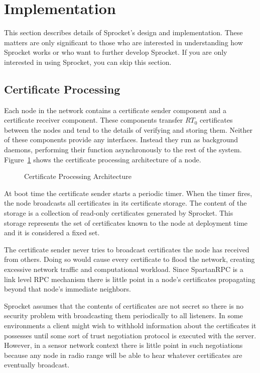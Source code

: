 \section{Implementation}

This section describes details of Sprocket's design and implementation. These matters are only
significant to those who are interested in understanding how Sprocket works or who want to
further develop Sprocket. If you are only interested in using Sprocket, you can skip this
section.

\subsection{Certificate Processing}
\label{sec:rt0-certificate-processing}

Each node in the network contains a certificate sender component and a certificate receiver
component. These components transfer $RT_0$ certificates between the nodes and tend to the
details of verifying and storing them. Neither of these components provide any interfaces.
Instead they run as background daemons, performing their function asynchronously to the rest of
the system. Figure~\ref{fig:certificate-daemon} shows the certificate processing architecture of
a node.

\begin{figure}[htbp]
  
  \centerline{\box\graph}
  \caption{Certificate Processing Architecture}
  \label{fig:certificate-daemon}
\end{figure}

At boot time the certificate sender starts a periodic timer. When the timer fires, the node
broadcasts all certificates in its certificate storage. The content of the storage is a
collection of read-only certificates generated by Sprocket. This storage represents the set of
certificates known to the node at deployment time and it is considered a fixed set.

The certificate sender never tries to broadcast certificates the node has received from others.
Doing so would cause every certificate to flood the network, creating excessive network traffic
and computational workload. Since SpartanRPC is a link level RPC mechanism there is little point
in a node's certificates propagating beyond that node's immediate neighbors.

Sprocket assumes that the contents of certificates are not secret so there is no security
problem with broadcasting them periodically to all listeners. In some environments a client
might wish to withhold information about the certificates it possesses until some sort of trust
negotiation protocol is executed with the server. However, in a sensor network context there is
little point in such negotiations because any node in radio range will be able to hear whatever
certificates are eventually broadcast. 

